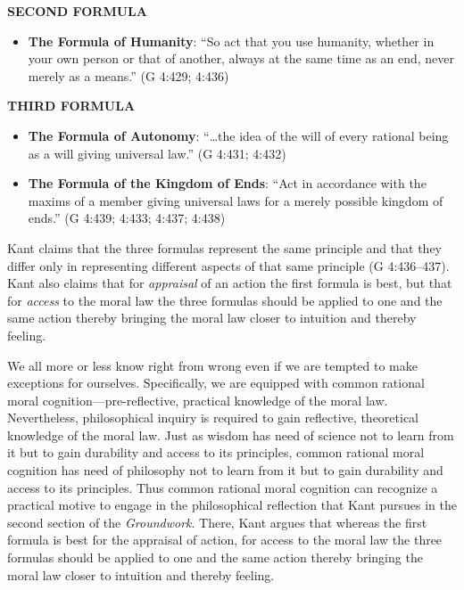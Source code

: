 \textbf{SECOND FORMULA}

\begin{itemize}
    \item \textbf{The Formula of Humanity}: ``So act that you use humanity, whether in your own person or that of another, always at the same time as an end, never merely as a means.'' (G 4:429; 4:436)
\end{itemize}

\textbf{THIRD FORMULA}

\begin{itemize}
    \item \textbf{The Formula of Autonomy}: ``\ldots{}the idea of the will of every rational being as a will giving universal law.'' (G 4:431; 4:432)
    \item \textbf{The Formula of the Kingdom of Ends}: ``Act in accordance with the maxims of a member giving universal laws for a merely possible kingdom of ends.'' (G 4:439; 4:433; 4:437; 4:438)
\end{itemize}

Kant claims that the three formulas represent the same principle and that they differ only in representing different aspects of that same principle (G 4:436--437). Kant also claims that for \emph{appraisal} of an action the first formula is best, but that for \emph{access} to the moral law the three formulas should be applied to one and the same action thereby bringing the moral law closer to intuition and thereby feeling.

We all more or less know right from wrong even if we are tempted to make exceptions for ourselves. Specifically, we are equipped with common rational moral cognition---pre-reflective, practical knowledge of the moral law. Nevertheless, philosophical inquiry is required to gain reflective, theoretical knowledge of the moral law. Just as wisdom has need of science not to learn from it but to gain durability and access to its principles, common rational moral cognition has need of philosophy not to learn from it but to gain durability and access to its principles. Thus common rational moral cognition can recognize a practical motive to engage in the philosophical reflection that Kant pursues in the second section of the \emph{Groundwork}. There, Kant argues that whereas the first formula is best for the appraisal of action, for access to the moral law the three formulas should be applied to one and the same action thereby bringing the moral law closer to intuition and thereby feeling.

